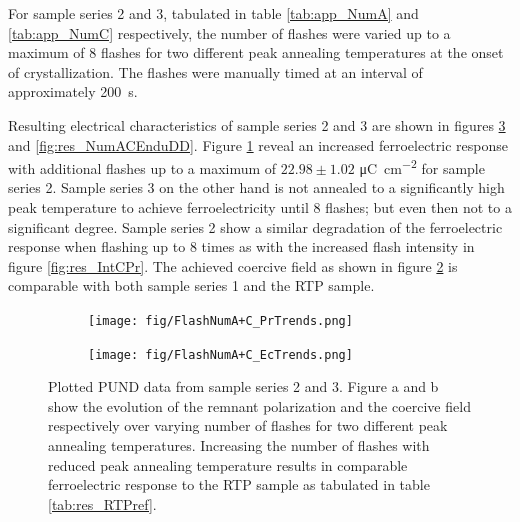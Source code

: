 \documentclass[11pt,twoside]{eitExjobb}
\begin{document}
For sample series 2 and 3, tabulated in table \ref{tab:app_NumA} and
\ref{tab:app_NumC} respectively, the number of flashes were varied up to a
maximum of 8 flashes for two different peak annealing temperatures at the onset
of crystallization. The flashes were manually timed at an interval of
approximately \SI{200}{\second}.

Resulting electrical characteristics of sample series 2 and 3 are shown in
figures \ref{fig:res_NumACPUND} and \ref{fig:res_NumACEnduDD}. Figure
\ref{fig:res_NumACPr} reveal an increased ferroelectric response with
additional flashes up to a maximum of $22.98 \pm 1.02$
\si{\micro\coulomb\per\centi\meter\squared} for sample series 2. Sample series 3
on the other hand is not annealed to a significantly high peak temperature to
achieve ferroelectricity until 8 flashes; but even then not to a significant
degree. Sample series 2 show a similar degradation of the ferroelectric response
when flashing up to 8 times as with the increased flash intensity in figure
\ref{fig:res_IntCPr}. %
The achieved coercive field as shown in figure \ref{fig:res_NumACEc} is
comparable with both sample series 1 and the RTP sample.

\begin{figure}[htbp]
    \centering
    \begin{subfigure}{.4\linewidth}
        \texttt{[image: fig/FlashNumA+C\_PrTrends.png]}
        \caption{}\label{fig:res_NumACPr}
    \end{subfigure}
    \begin{subfigure}{.4\linewidth}
        \texttt{[image: fig/FlashNumA+C\_EcTrends.png]}
        \caption{}\label{fig:res_NumACEc}    
    \end{subfigure}
    \caption{Plotted PUND data from sample series 2 and 3. Figure a and b show the
    evolution of the remnant polarization and the coercive field respectively
    over varying number of flashes for two different peak annealing temperatures.
    Increasing the number of flashes with reduced peak annealing temperature
    results in comparable ferroelectric response to the RTP sample as tabulated
    in table \ref{tab:res_RTPref}.}\label{fig:res_NumACPUND}
\end{figure}
\end{document}
